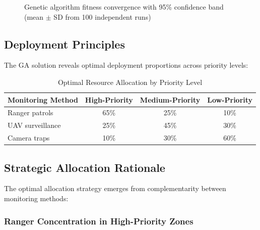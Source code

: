 \begin{figure}[h]
\caption{Genetic algorithm fitness convergence with 95\% confidence band (mean $\pm$ SD from 100 independent runs)}
\end{figure}

\subsection{Deployment Principles}

The GA solution reveals optimal deployment proportions across priority levels:

\begin{table}[h]
\centering
\caption{Optimal Resource Allocation by Priority Level}
\begin{tabular}{lccc}
\hline
\textbf{Monitoring Method} & \textbf{High-Priority} & \textbf{Medium-Priority} & \textbf{Low-Priority} \\
\hline
Ranger patrols & 65\% & 25\% & 10\% \\
UAV surveillance & 25\% & 45\% & 30\% \\
Camera traps & 10\% & 30\% & 60\% \\
\hline
\end{tabular}
\end{table}

\subsection{Strategic Allocation Rationale}

The optimal allocation strategy emerges from complementarity between monitoring methods:

\subsubsection{Ranger Concentration in High-Priority Zones}

